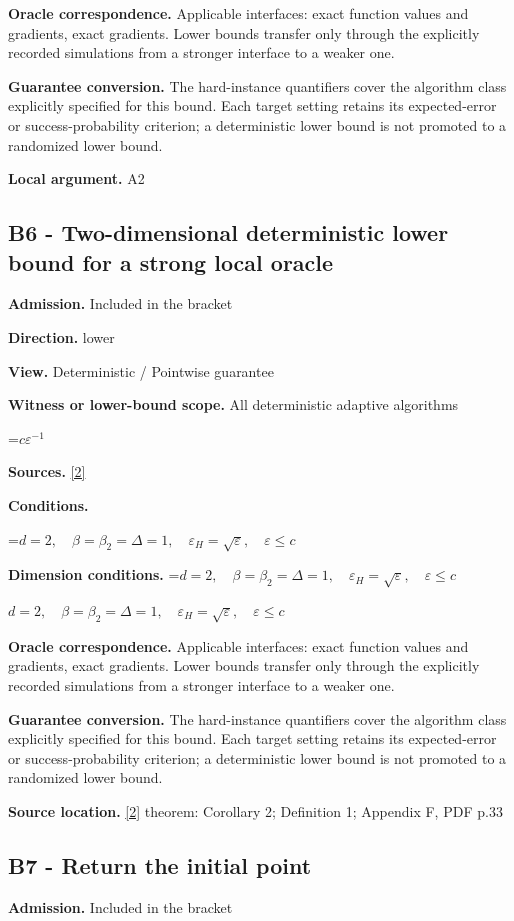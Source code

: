 \documentclass[10pt,a4paper]{article}
\newcommand{\AtlasMath}[1]{\par\begingroup\centering\setbox0=\hbox{$\displaystyle #1$}\ifdim\wd0>1.4\linewidth\typeout{ATLAS WIDE FORMULA: \the\wd0}\fi\ifdim\wd0>\linewidth\resizebox{\linewidth}{!}{\box0}\else\box0\fi\par\endgroup}
\newcommand{\AtlasInlineMath}[1]{\begingroup\setbox0=\hbox{$#1$}\ifdim\wd0>.4\linewidth\endgroup\AtlasMath{#1}\else\endgroup$#1$\fi}
\begin{document}
\textbf{Oracle correspondence.} Applicable interfaces: exact function values and gradients, exact gradients. Lower bounds transfer only through the explicitly recorded simulations from a stronger interface to a weaker one.

\textbf{Guarantee conversion.} The hard-instance quantifiers cover the algorithm class explicitly specified for this bound. Each target setting retains its expected-error or success-probability criterion; a deterministic lower bound is not promoted to a randomized lower bound.

\textbf{Local argument.} A2

\subsection{B6 - Two-dimensional deterministic lower bound for a strong local oracle}
\textbf{Admission.} Included in the bracket

\textbf{Direction.} lower

\textbf{View.} Deterministic / Pointwise guarantee

\textbf{Witness or lower-bound scope.} All deterministic adaptive algorithms

\AtlasMath{c\varepsilon^{-1}}
\textbf{Sources.} \href{https://proceedings.mlr.press/v235/kontogiannis24a.html}{[2]}

\textbf{Conditions.} 
\AtlasMath{d=2,\quad\beta=\beta_2=\Delta=1,\quad\varepsilon_H=\sqrt\varepsilon,\quad\varepsilon\le c}


\textbf{Dimension conditions.} \AtlasInlineMath{d=2,\quad\beta=\beta_2=\Delta=1,\quad\varepsilon_H=\sqrt\varepsilon,\quad\varepsilon\le c}

\textbf{Oracle correspondence.} Applicable interfaces: exact function values and gradients, exact gradients. Lower bounds transfer only through the explicitly recorded simulations from a stronger interface to a weaker one.

\textbf{Guarantee conversion.} The hard-instance quantifiers cover the algorithm class explicitly specified for this bound. Each target setting retains its expected-error or success-probability criterion; a deterministic lower bound is not promoted to a randomized lower bound.

\textbf{Source location.} \href{https://proceedings.mlr.press/v235/kontogiannis24a.html}{[2]} theorem: Corollary 2; Definition 1; Appendix F, PDF p.33

\subsection{B7 - Return the initial point}
\textbf{Admission.} Included in the bracket
\end{document}
